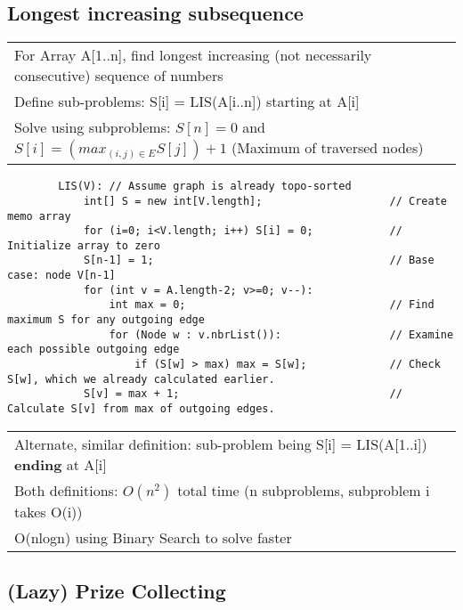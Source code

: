 \documentclass{article}
\begin{document}
    \subsection{Longest increasing subsequence}
    \begin{tabular}{l}
        For Array A[1..n], find longest increasing (not necessarily consecutive) sequence of numbers\\
        Define sub-problems: S[i] = LIS(A[i..n]) starting at A[i]\\
        Solve using subproblems: $S[n] = 0$ and $S[i] = (max_{(i,j) \in E} S[j]) + 1$ (Maximum of traversed nodes)\\
    \end{tabular}

    \begin{verbatim}
        LIS(V): // Assume graph is already topo-sorted
            int[] S = new int[V.length];                    // Create memo array
            for (i=0; i<V.length; i++) S[i] = 0;            // Initialize array to zero
            S[n-1] = 1;                                     // Base case: node V[n-1]
            for (int v = A.length-2; v>=0; v--):
                int max = 0;                                // Find maximum S for any outgoing edge
                for (Node w : v.nbrList()):                 // Examine each possible outgoing edge
                    if (S[w] > max) max = S[w];             // Check S[w], which we already calculated earlier.
            S[v] = max + 1;                                 // Calculate S[v] from max of outgoing edges.
    \end{verbatim}

    
    \begin{tabular}{l}
        Alternate, similar definition: sub-problem being S[i] = LIS(A[1..i]) \textbf{ending} at A[i]\\
        Both definitions: $O(n^{2})$ total time (n subproblems, subproblem i takes O(i))\\
        O(nlogn) using Binary Search to solve faster\\
    \end{tabular}

    \pagebreak

    \subsection{(Lazy) Prize Collecting}
\end{document}
